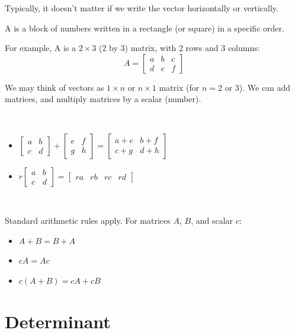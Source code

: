 \documentclass[11pt,fleqn]{book} %
\begin{document}
Typically, it doesn't matter if we write the vector horizontally or vertically.

\begin{definition}[Matrix]
    A  is a block of numbers written in a rectangle (or square) in a specific order.
\end{definition}

For example, A is a $2 \times 3$ (2 by 3) matrix, with 2 rows and 3 columns: $$A = \begin{bmatrix} a & b & c \\ d & e & f \end{bmatrix}$$

We may think of vectors as $1 \times n$ or $n \times 1$ matrix (for $n = 2$ or $3$). We can add matrices, and multiply matrices by a scalar (number).

{~~~}

\begin{itemize}
    \item $\begin{bmatrix} a & b \\ c & d \end{bmatrix} + \begin{bmatrix} e & f \\ g & h \end{bmatrix} = \begin{bmatrix} a + e & b + f \\ c + g & d + h \end{bmatrix}$
    \item $r\begin{bmatrix} a & b \\ c & d \end{bmatrix} = \begin{bmatrix} ra & rb & rc & rd \end{bmatrix}$
\end{itemize}

{~~~}

Standard arithmetic rules apply. For matrices $A$, $B$, and scalar $c$:

\begin{itemize}
    \item $A + B = B + A$
    \item $cA = Ac$
    \item $c(A + B) = cA + cB$
\end{itemize}

\section{Determinant}
\end{document}
